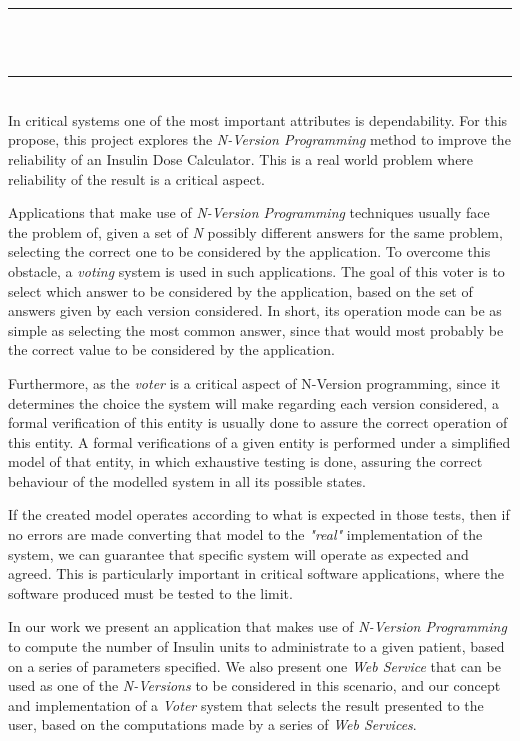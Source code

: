 \begin{titlepage}

\newcommand{\HRule}{\rule{\linewidth}{0.5mm}}

\noindent
\HRule \\[0.05cm]
{\normalsize \bfseries \color{black}{EXECUTIVE SUMMARY}} \\[0.05cm]
\HRule \\[0.05cm]

    In critical systems one of the most important attributes is dependability. For this propose, this project explores the \emph{N-Version Programming} method to improve the reliability of an Insulin Dose Calculator. This is a real world problem where reliability of the result is a critical aspect.
    
    Applications that make use of \emph{N-Version Programming} techniques usually face the problem of, given a set of \emph{N} possibly different answers for the same problem, selecting the correct one to be considered by the application. To overcome this obstacle, a \emph{voting} system is used in such applications. The goal of this voter is to select which answer to be considered by the application, based on the set of answers given by each version considered. In short, its operation mode can be as simple as selecting the most common answer, since that would most probably be the correct value to be considered by the application.
    
    Furthermore, as the \emph{voter} is a critical aspect of N-Version programming, since it determines the choice the system will make regarding each version considered, a formal verification of this entity is usually done to assure the correct operation of this entity. A formal verifications of a given entity is performed under a simplified model of that entity, in which exhaustive testing is done, assuring the correct behaviour of the modelled system in all its possible states.
    
    If the created model operates according to what is expected in those tests, then if no errors are made converting that model to the \emph{"real"} implementation of the system, we can guarantee that specific system will operate as expected and agreed. This is particularly important in critical software applications, where the software produced must be tested to the limit.
    
    
    In our work we present an application that makes use of \emph{N-Version Programming} to compute the number of Insulin units to administrate to a given patient, based on a series of parameters specified. We also present one \emph{Web Service} that can be used as one of the \emph{N-Versions} to be considered in this scenario, and our concept and implementation of a \emph{Voter} system that selects the result presented to the user, based on the computations made by a series of \emph{Web Services}.

\end{titlepage}